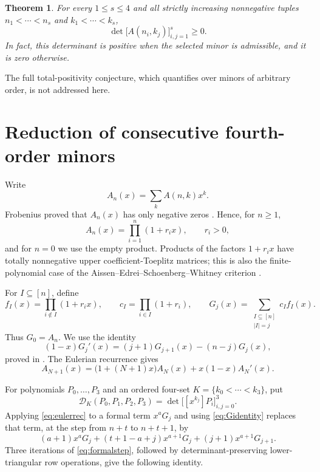 \documentclass[11pt]{article}
\newtheorem{theorem}{Theorem}
\newcommand{\coeff}[2]{[x^{#1}]#2}
\newcommand{\cD}{\mathcal{D}}
\begin{document}
\begin{theorem}\label{thm:main}
For every $1\leq s\leq4$ and all strictly increasing nonnegative tuples
$n_1<\cdots<n_s$ and $k_1<\cdots<k_s$,
\[
  \det\bigl[A(n_i,k_j)\bigr]_{i,j=1}^s\geq0.
\]
In fact, this determinant is positive when the selected minor is admissible,
and it is zero otherwise.
\end{theorem}

The full total-positivity conjecture, which quantifies over minors of arbitrary
order, is not addressed here.

\section{Reduction of consecutive fourth-order minors}

Write
\[
 A_n(x)=\sum_k A(n,k)x^k.
\]
Frobenius proved that $A_n(x)$ has only negative zeros
\cite{Frobenius1910}.  Hence, for $n\geq1$,
\[
 A_n(x)=\prod_{i=1}^n(1+r_i x),\qquad r_i>0,
\]
and for $n=0$ we use the empty product.  Products of the factors
$1+r_i x$ have totally nonnegative upper coefficient-Toeplitz matrices; this
is also the finite-polynomial case of the Aissen--Edrei--Schoenberg--Whitney
criterion \cite{AissenEtAl1951}.

For $I\subseteq[n]$, define
\[
 f_I(x)=\prod_{i\notin I}(1+r_i x),\qquad
 c_I=\prod_{i\in I}(1+r_i),\qquad
 G_j(x)=\sum_{\substack{I\subseteq[n]\\|I|=j}}c_I f_I(x).
\]
Thus $G_0=A_n$.  We use the identity
\begin{equation}\label{eq:Gidentity}
 (1-x)G_j'(x)=(j+1)G_{j+1}(x)-(n-j)G_j(x),
\end{equation}
proved in \cite[Lemma~2.6]{Mao2026}.  The Eulerian recurrence gives
\begin{equation}\label{eq:eulerrec}
 A_{N+1}(x)=\bigl(1+(N+1)x\bigr)A_N(x)+x(1-x)A_N'(x).
\end{equation}

For polynomials $P_0,\ldots,P_3$ and an ordered four-set
$K=\{k_0<\cdots<k_3\}$, put
\[
 \cD_K(P_0,P_1,P_2,P_3)
   =\det\bigl[\coeff{k_j}{P_i}\bigr]_{i,j=0}^3.
\]
Applying \eqref{eq:eulerrec} to a formal term $x^aG_j$ and using
\eqref{eq:Gidentity} replaces that term, at the step from $n+t$ to
$n+t+1$, by
\begin{equation}\label{eq:formalstep}
 (a+1)x^aG_j+(t+1-a+j)x^{a+1}G_j
       +(j+1)x^{a+1}G_{j+1}.
\end{equation}
Three iterations of \eqref{eq:formalstep}, followed by
determinant-preserving lower-triangular row operations, give the following
identity.
\end{document}
